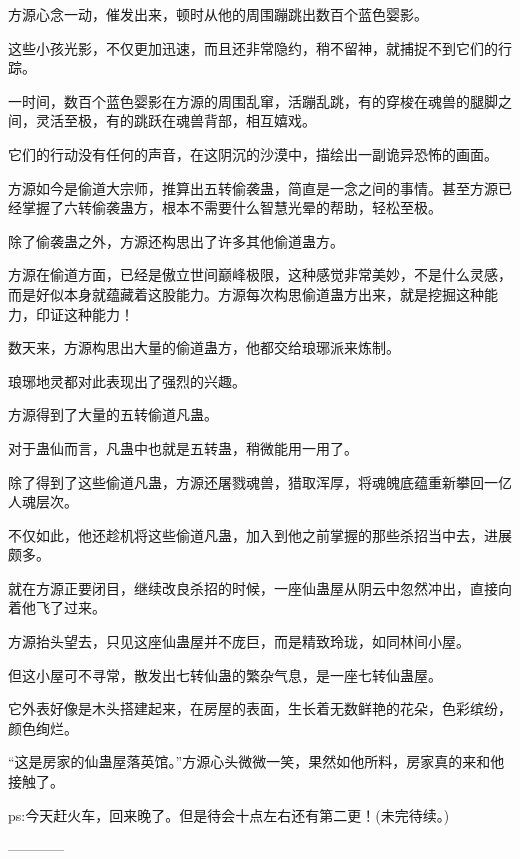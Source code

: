 \begin{this_body}
方源心念一动，催发出来，顿时从他的周围蹦跳出数百个蓝色婴影。

这些小孩光影，不仅更加迅速，而且还非常隐约，稍不留神，就捕捉不到它们的行踪。

一时间，数百个蓝色婴影在方源的周围乱窜，活蹦乱跳，有的穿梭在魂兽的腿脚之间，灵活至极，有的跳跃在魂兽背部，相互嬉戏。

它们的行动没有任何的声音，在这阴沉的沙漠中，描绘出一副诡异恐怖的画面。

方源如今是偷道大宗师，推算出五转偷袭蛊，简直是一念之间的事情。甚至方源已经掌握了六转偷袭蛊方，根本不需要什么智慧光晕的帮助，轻松至极。

除了偷袭蛊之外，方源还构思出了许多其他偷道蛊方。

方源在偷道方面，已经是傲立世间巅峰极限，这种感觉非常美妙，不是什么灵感，而是好似本身就蕴藏着这股能力。方源每次构思偷道蛊方出来，就是挖掘这种能力，印证这种能力！

数天来，方源构思出大量的偷道蛊方，他都交给琅琊派来炼制。

琅琊地灵都对此表现出了强烈的兴趣。

方源得到了大量的五转偷道凡蛊。

对于蛊仙而言，凡蛊中也就是五转蛊，稍微能用一用了。

除了得到了这些偷道凡蛊，方源还屠戮魂兽，猎取浑厚，将魂魄底蕴重新攀回一亿人魂层次。

不仅如此，他还趁机将这些偷道凡蛊，加入到他之前掌握的那些杀招当中去，进展颇多。

就在方源正要闭目，继续改良杀招的时候，一座仙蛊屋从阴云中忽然冲出，直接向着他飞了过来。

方源抬头望去，只见这座仙蛊屋并不庞巨，而是精致玲珑，如同林间小屋。

但这小屋可不寻常，散发出七转仙蛊的繁杂气息，是一座七转仙蛊屋。

它外表好像是木头搭建起来，在房屋的表面，生长着无数鲜艳的花朵，色彩缤纷，颜色绚烂。

“这是房家的仙蛊屋落英馆。”方源心头微微一笑，果然如他所料，房家真的来和他接触了。

ps:今天赶火车，回来晚了。但是待会十点左右还有第二更！(未完待续。)

------------

\end{this_body}

